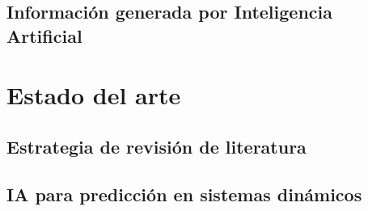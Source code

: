 \documentclass[12pt,a4paper]{report}
\begin{document}
\section{Información generada por Inteligencia Artificial}

%
%
%
%
%



\chapter{Estado del arte}

%
%


\section{Estrategia de revisión de literatura}

%
%
%


\section{IA para predicción en sistemas dinámicos}

%
%
\end{document}

